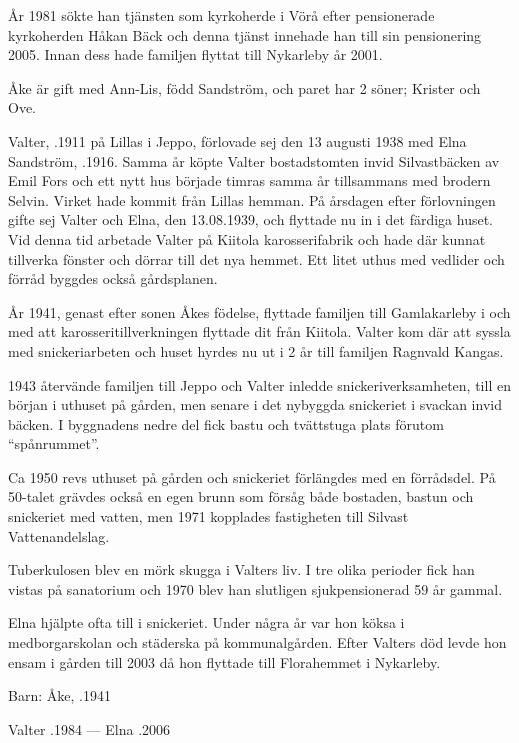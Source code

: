 År 1981 sökte han tjänsten som kyrkoherde i Vörå efter pensionerade kyrkoherden Håkan Bäck och denna tjänst innehade han till sin pensionering 2005. Innan dess hade familjen flyttat till Nykarleby år 2001.

Åke är gift med Ann-Lis, född Sandström, och paret har 2 söner;	Krister och Ove.


%
Valter, .1911 på Lillas i Jeppo, förlovade sej den 13 augusti 1938 med Elna Sandström, .1916. Samma år köpte Valter bostadstomten invid Silvastbäcken av Emil Fors och ett nytt hus började timras samma år tillsammans med brodern Selvin. Virket hade kommit från Lillas hemman. På årsdagen efter förlovningen gifte sej Valter och Elna, den 13.08.1939, och flyttade nu in i det färdiga huset. Vid denna tid arbetade Valter på Kiitola karosserifabrik och hade där kunnat tillverka fönster och dörrar till det nya hemmet. Ett litet uthus med vedlider och förråd byggdes också gårdsplanen.

År 1941, genast efter sonen Åkes födelse, flyttade familjen till Gamlakarleby i och med att karosseritillverkningen flyttade dit från Kiitola. Valter kom där att syssla med snickeriarbeten och huset hyrdes nu ut i 2 år till familjen Ragnvald Kangas.

1943 återvände familjen till Jeppo och Valter inledde snickeriverksamheten, till en början i uthuset på gården, men senare i det nybyggda snickeriet i svackan invid bäcken. I byggnadens nedre del fick bastu och tvättstuga plats förutom ``spånrummet''.

Ca 1950 revs uthuset på gården och snickeriet förlängdes med en förrådsdel. På 50-talet grävdes också en egen brunn som försåg både bostaden, bastun och snickeriet med vatten, men 1971 kopplades fastigheten till Silvast Vattenandelslag.

Tuberkulosen blev en mörk skugga i Valters liv. I tre olika perioder fick han vistas på sanatorium och 1970 blev han slutligen sjukpensionerad 59 år gammal.

Elna hjälpte ofta till i snickeriet. Under några år var hon köksa i medborgarskolan och städerska på kommunalgården. Efter Valters död levde hon ensam i gården till 2003 då hon flyttade till Florahemmet i Nykarleby.

Barn: Åke, .1941

Valter .1984  ---  Elna .2006




